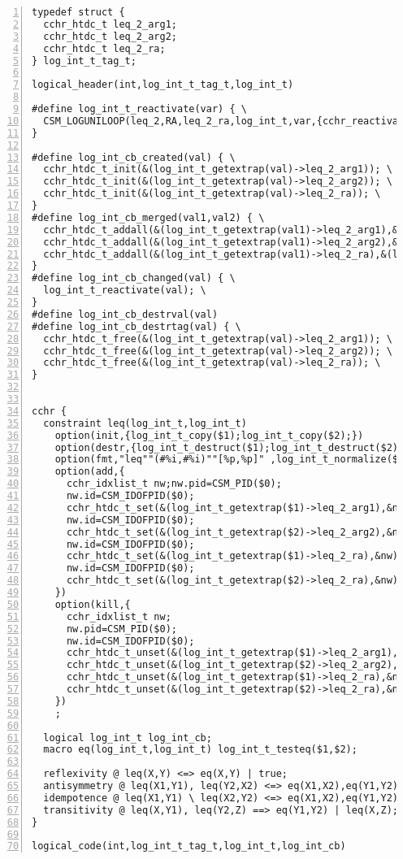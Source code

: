 {\scriptsize
\begin{Verbatim}[frame=single,numbers=left]
typedef struct {
  cchr_htdc_t leq_2_arg1;
  cchr_htdc_t leq_2_arg2;
  cchr_htdc_t leq_2_ra;
} log_int_t_tag_t;

logical_header(int,log_int_t_tag_t,log_int_t)

#define log_int_t_reactivate(var) { \
  CSM_LOGUNILOOP(leq_2,RA,leq_2_ra,log_int_t,var,{cchr_reactivate_leq_2(CSM_PID(RA));}) \
}

#define log_int_cb_created(val) { \
  cchr_htdc_t_init(&(log_int_t_getextrap(val)->leq_2_arg1)); \
  cchr_htdc_t_init(&(log_int_t_getextrap(val)->leq_2_arg2)); \
  cchr_htdc_t_init(&(log_int_t_getextrap(val)->leq_2_ra)); \
}
#define log_int_cb_merged(val1,val2) { \
  cchr_htdc_t_addall(&(log_int_t_getextrap(val1)->leq_2_arg1),&(log_int_t_getextrap(val2)->leq_2_arg1)); \
  cchr_htdc_t_addall(&(log_int_t_getextrap(val1)->leq_2_arg2),&(log_int_t_getextrap(val2)->leq_2_arg2)); \
  cchr_htdc_t_addall(&(log_int_t_getextrap(val1)->leq_2_ra),&(log_int_t_getextrap(val2)->leq_2_ra)); \
}
#define log_int_cb_changed(val) { \
  log_int_t_reactivate(val); \
}
#define log_int_cb_destrval(val)
#define log_int_cb_destrtag(val) { \
  cchr_htdc_t_free(&(log_int_t_getextrap(val)->leq_2_arg1)); \
  cchr_htdc_t_free(&(log_int_t_getextrap(val)->leq_2_arg2)); \
  cchr_htdc_t_free(&(log_int_t_getextrap(val)->leq_2_ra)); \
}


cchr {
  constraint leq(log_int_t,log_int_t) 
    option(init,{log_int_t_copy($1);log_int_t_copy($2);})
    option(destr,{log_int_t_destruct($1);log_int_t_destruct($2);}) 
    option(fmt,"leq""(#%i,#%i)""[%p,%p]" ,log_int_t_normalize($1)->_id,log_int_t_normalize($2)->_id ,$1,$2)
    option(add,{
      cchr_idxlist_t nw;nw.pid=CSM_PID($0); 
      nw.id=CSM_IDOFPID($0); 
      cchr_htdc_t_set(&(log_int_t_getextrap($1)->leq_2_arg1),&nw);
      nw.id=CSM_IDOFPID($0); 
      cchr_htdc_t_set(&(log_int_t_getextrap($2)->leq_2_arg2),&nw);
      nw.id=CSM_IDOFPID($0); 
      cchr_htdc_t_set(&(log_int_t_getextrap($1)->leq_2_ra),&nw);
      nw.id=CSM_IDOFPID($0); 
      cchr_htdc_t_set(&(log_int_t_getextrap($2)->leq_2_ra),&nw);
    })
    option(kill,{
      cchr_idxlist_t nw; 
      nw.pid=CSM_PID($0); 
      nw.id=CSM_IDOFPID($0); 
      cchr_htdc_t_unset(&(log_int_t_getextrap($1)->leq_2_arg1),&nw);
      cchr_htdc_t_unset(&(log_int_t_getextrap($2)->leq_2_arg2),&nw);
      cchr_htdc_t_unset(&(log_int_t_getextrap($1)->leq_2_ra),&nw);
      cchr_htdc_t_unset(&(log_int_t_getextrap($2)->leq_2_ra),&nw);
    })
    ;
  
  logical log_int_t log_int_cb;
  macro eq(log_int_t,log_int_t) log_int_t_testeq($1,$2);
  
  reflexivity @ leq(X,Y) <=> eq(X,Y) | true;
  antisymmetry @ leq(X1,Y1), leq(Y2,X2) <=> eq(X1,X2),eq(Y1,Y2) | {log_int_t_seteq(X1,Y1);};
  idempotence @ leq(X1,Y1) \ leq(X2,Y2) <=> eq(X1,X2),eq(Y1,Y2) | true;
  transitivity @ leq(X,Y1), leq(Y2,Z) ==> eq(Y1,Y2) | leq(X,Z);
}

logical_code(int,log_int_t_tag_t,log_int_t,log_int_cb)
\end{Verbatim}
}

